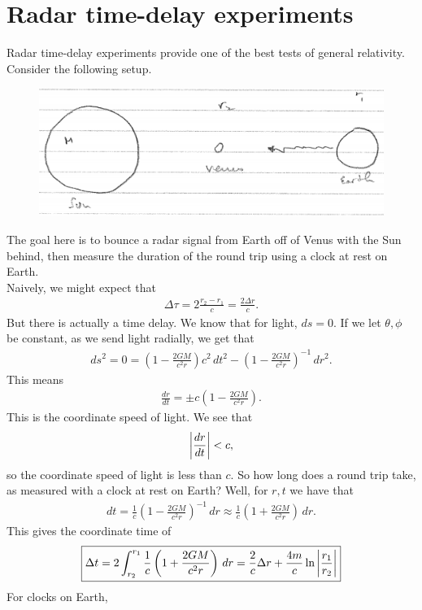 \documentclass{book}
\theoremstyle{definition}
\newcommand{\f}[2]{\frac{#1}{#2}}
\newcommand{\lp}{\left(}
\newcommand{\rp}{\right)}
\begin{document}
\section{Radar time-delay experiments}

Radar time-delay experiments provide one of the best tests of general relativity. Consider the following setup.
\begin{figure}[!htb]
	\centering
	\includegraphics[scale=0.3]{radar}
\end{figure}
The goal here is to bounce a radar signal from Earth off of Venus with the Sun behind, then measure the duration of the round trip using a clock at rest on Earth. \\

Naively, we might expect that
\begin{align*}
\Delta \tau = 2 \f{r_2 - r_1}{c} = \f{2\Delta r}{c}.
\end{align*}
But there is actually a time delay. We know that for light, $ds = 0$. If we let $\theta, \phi$ be constant, as we send light radially, we get that
\begin{align*}
ds^2 = 0 = \lp 1 - \f{2GM}{c^2 r} \rp c^2\,dt^2 - \lp 1 - \f{2GM}{c^2 r} \rp^{-1}\,dr^2.
\end{align*} 
This means
\begin{align*}
\f{dr}{dt} = \pm c\lp 1 - \f{2GM}{c^2 r} \rp.
\end{align*}
This is the coordinate speed of light. We see that 
\begin{align*}
\abs{\f{dr}{dt}} < c,
\end{align*}
so the coordinate speed of light is less than $c$. So how long does a round trip take, as measured with a clock at rest on Earth? Well, for $r,t$ we have that
\begin{align*}
dt = \f{1}{c}\lp 1 - \f{2GM}{c^2 r}\rp^{-1}\,dr \approx \f{1}{c}\lp 1 + \f{2GM}{c^2 r}\rp\,dr.
\end{align*}
This gives the coordinate time of
\begin{align*}
\boxed{\Delta t = 2 \int^{r_1}_{r_2} \f{1}{c}\lp 1 + \f{2GM}{c^2 r}\rp\,dr = \f{2}{c}\Delta r + \f{4m}{c}\ln \abs{\f{r_1}{r_2}}}
\end{align*}
For clocks on Earth,
\end{document}
